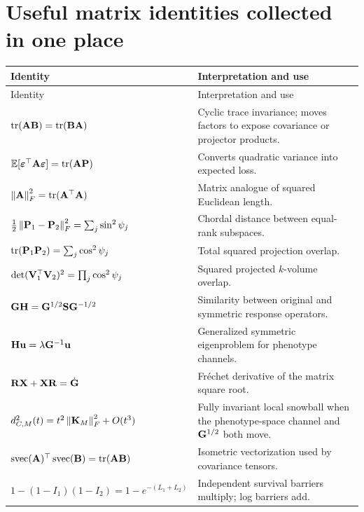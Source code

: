 \chapter{Useful matrix identities collected in one place}

\begin{longtable}{@{}p{}p{}@{}}
\toprule
Identity & Interpretation and use \\
\midrule
\endfirsthead
\toprule
Identity & Interpretation and use \\
\midrule
\endhead
\(\operatorname{tr}(\mathbf A\mathbf B)=\operatorname{tr}(\mathbf B\mathbf A)\) & Cyclic trace invariance; moves factors to expose covariance or projector products. \\
\(\mathbb E[\boldsymbol\varepsilon^\top\mathbf A\boldsymbol\varepsilon]=\operatorname{tr}(\mathbf A\mathbf{P})\) & Converts quadratic variance into expected loss. \\
\(\left\lVert \mathbf A\right\rVert_F^2=\operatorname{tr}(\mathbf A^\top\mathbf A)\) & Matrix analogue of squared Euclidean length. \\
\(\tfrac12\left\lVert \mathbf{P}_1-\mathbf{P}_2\right\rVert_F^2=\sum_j\sin^2\psi_j\) & Chordal distance between equal-rank subspaces. \\
\(\operatorname{tr}(\mathbf{P}_1\mathbf{P}_2)=\sum_j\cos^2\psi_j\) & Total squared projection overlap. \\
\(\det(\mathbf{V}_1^\top\mathbf{V}_2)^2=\prod_j\cos^2\psi_j\) & Squared projected \(k\)-volume overlap. \\
\(\mathbf{G}\mathbf{H}=\mathbf{G}^{1/2}\mathbf{S}\mathbf{G}^{-1/2}\) & Similarity between original and symmetric response operators. \\
\(\mathbf{H}\mathbf u=\lambda\mathbf{G}^{-1}\mathbf u\) & Generalized symmetric eigenproblem for phenotype channels. \\
\(\mathbf{R}\mathbf X+\mathbf X\mathbf{R}=\dot{\mathbf{G}}\) & Fr\'echet derivative of the matrix square root. \\
\(d_{C,M}^2(t)=t^2\left\lVert \mathbf K_M\right\rVert_F^2+O(t^3)\) & Fully invariant local snowball when the phenotype-space channel and \(\mathbf{G}^{1/2}\) both move. \\
\(\operatorname{svec}(\mathbf A)^\top\operatorname{svec}(\mathbf B)=\operatorname{tr}(\mathbf A\mathbf B)\) & Isometric vectorization used by covariance tensors. \\
\(1-(1-I_1)(1-I_2)=1-e^{-(L_1+L_2)}\) & Independent survival barriers multiply; log barriers add. \\
\bottomrule
\end{longtable}
